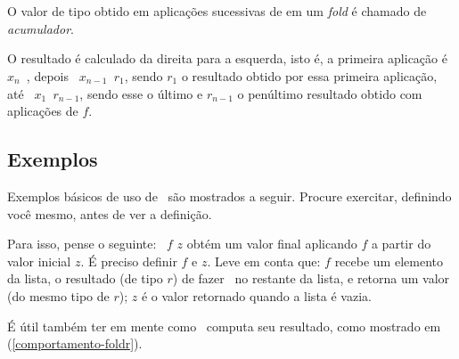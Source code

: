 O valor de tipo  obtido em aplicações sucessivas de  em
um {\em fold} é chamado de {\em acumulador\/}.

O resultado é calculado da direita para a esquerda, isto é, a primeira
aplicação é {\tt {} $x_n$ }, depois {\tt {} $x_{n-1}$
  $r_1$}, sendo $r_1$ o resultado obtido por essa primeira aplicação,
até {\tt {} $x_1$ $r_{n-1}$}, sendo esse o último e $r_{n-1}$ o
penúltimo resultado obtido com aplicações de $f$.

\subsection*{Exemplos}

Exemplos básicos de uso de \foldr\ são mostrados a seguir. Procure
exercitar, definindo você mesmo, antes de ver a definição.

Para isso, pense o seguinte: \foldr\ $f$ $z$ obtém um valor final
aplicando $f$ a partir do valor inicial $z$. É preciso definir $f$ e
$z$. Leve em conta que: $f$ recebe um elemento da lista, o resultado
(de tipo $r$) de fazer \foldr\ no restante da lista, e retorna um
valor (do mesmo tipo de $r$); $z$ é o valor retornado quando a lista é
vazia.

É útil também ter em mente como \foldr\ computa seu resultado, como
mostrado em (\ref{comportamento-foldr}).

